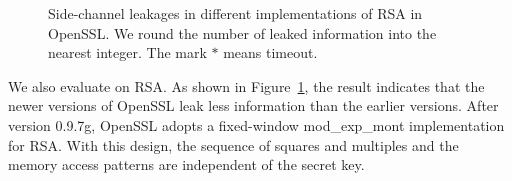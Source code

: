 \begin{figure}
    \caption{Side-channel leakages in different implementations of RSA in OpenSSL\@. 
        We round the number of leaked information into the nearest integer. 
        The mark $*$ means timeout.}
    \label{fig:rsa}
\end{figure}
We also evaluate \tool{} on RSA.  %
 As shown in Figure~\ref{fig:rsa}, the result indicates that the newer
versions of OpenSSL leak less information than the earlier
versions. After version 0.9.7g, OpenSSL adopts a fixed-window \textsf{mod\_exp\_mont}
implementation for RSA\@. With this design, the sequence of squares and
multiples and the memory access patterns are independent of the secret key.
